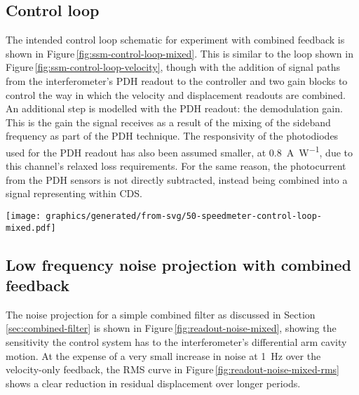 \subsection{Control loop}
The intended control loop schematic for experiment with combined feedback is shown in Figure\,\ref{fig:ssm-control-loop-mixed}. This is similar to the loop shown in Figure\,\ref{fig:ssm-control-loop-velocity}, though with the addition of signal paths from the interferometer's \gls{PDH} readout to the controller and two gain blocks to control the way in which the velocity and displacement readouts are combined. An additional step is modelled with the \gls{PDH} readout: the demodulation gain. This is the gain the signal receives as a result of the mixing of the sideband frequency as part of the \gls{PDH} technique. The responsivity of the photodiodes used for the \gls{PDH} readout has also been assumed smaller, at \SI{0.8}{\ampere\per\watt}, due to this channel's relaxed loss requirements. For the same reason, the photocurrent from the \gls{PDH} sensors is not directly subtracted, instead being combined into a signal representing \LMINUS{} within \gls{CDS}.

\begin{sidewaysfigure}
  \texttt{[image: graphics/generated/from-svg/50-speedmeter-control-loop-mixed.pdf]}
  \caption[Modelled \SSMEXPT{} control loop using both displacement and velocity feedback]{\label{fig:ssm-control-loop-mixed}\SSMEXPT{} control loop model. This control loop is similar to that shown in Figure\,\ref{fig:ssm-control-loop-velocity}, but with the addition of components used to send the displacement-sensitive \gls{PDH} readout to \gls{CDS}. Within \gls{CDS}, additional gain blocks allow for control over the way in which the velocity and displacement readouts are combined into one feedback signal.}
\end{sidewaysfigure}

\subsection{Low frequency noise projection with combined feedback}
The \LMINUS{} noise projection for a simple combined filter as discussed in Section\,\ref{sec:combined-filter} is shown in Figure\,\ref{fig:readout-noise-mixed}, showing the sensitivity the control system has to the interferometer's differential arm cavity motion. At the expense of a very small increase in noise at \SI{1}{\hertz} over the velocity-only feedback, the \gls{RMS} curve in Figure\,\ref{fig:readout-noise-mixed-rms} shows a clear reduction in residual displacement over longer periods.

